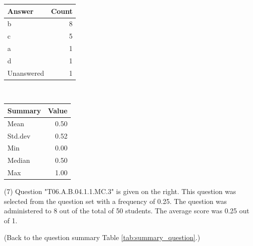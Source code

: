 \documentclass[12pt,english,nohyper]{tufte-handout}\usepackage[]{graphicx}\usepackage[]{color}
\begin{document}
\begin{center}%
\begin{tabular}{lr}
  \hline
Answer & Count \\ 
  \hline
b &   8 \\ 
  c &   5 \\ 
  a &   1 \\ 
  d &   1 \\ 
  Unanswered &   1 \\ 
   \hline
\end{tabular}
~~~~~~~~%
\begin{tabular}{lr}
  \hline
Summary & Value \\ 
  \hline
Mean & 0.50 \\ 
  Std.dev & 0.52 \\ 
  Min & 0.00 \\ 
  Median & 0.50 \\ 
  Max & 1.00 \\ 
   \hline
\end{tabular}
\end{center}\newpage{} (7) Question "T06.A.B.04.1.1.MC.3" is given on the right. This question was selected from the question set with a frequency of 0.25. The question was administered to 8 out of the total of 50 students. The average score was 0.25 out of 1.

 (Back to the question summary Table \ref{tab:summary_question}.)
\end{document}
